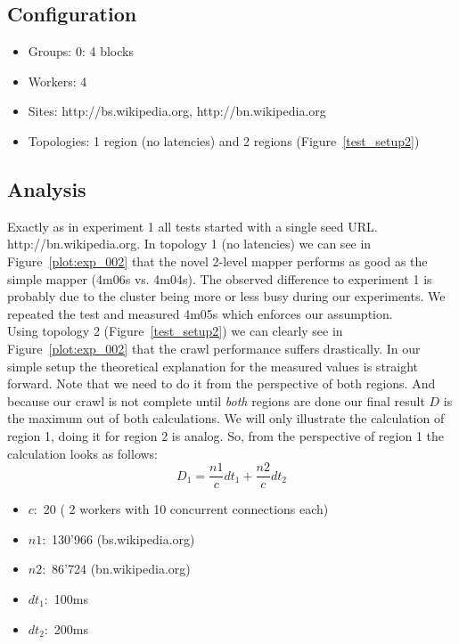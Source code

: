 \subsection{Configuration}
\begin{itemize}
  \item Groups: 0: 4 blocks
  \item Workers: 4
  \item Sites: http://bs.wikipedia.org, http://bn.wikipedia.org
  \item Topologies: 1 region (no latencies) and 2 regions (Figure~\ref{test_setup2})
\end{itemize}

\subsection{Analysis}
Exactly as in experiment 1 all tests started with a single seed URL. http://bn.wikipedia.org. In topology 1 (no latencies) we can see in Figure~\ref{plot:exp_002} that the novel 2-level mapper performs as good as the simple mapper (4m06s vs. 4m04s). The observed difference to experiment 1 is probably due to the cluster being more or less busy during our experiments. We repeated the test and measured 4m05s which enforces our assumption.
\\
Using topology 2 (Figure~\ref{test_setup2}) we can clearly see in Figure~\ref{plot:exp_002} that the crawl performance suffers drastically. In our simple setup the theoretical explanation for the measured values is straight forward. Note that we need to do it from the perspective of both regions. And because our crawl is not complete until \emph{both} regions are done our final result $D$ is the maximum out of both calculations. We will only illustrate the calculation of region 1, doing it for region 2 is analog. So, from the perspective of region 1 the calculation looks as follows:
\newline
\[ D_1 = \frac{n1}{c} dt_1 + \frac{n2}{c} dt_2 \]
\newline
\begin{itemize}
  \item $c:$ 20 ( 2 workers with 10 concurrent connections each)
  \item $n1:$ 130'966 (bs.wikipedia.org)
  \item $n2:$ 86'724 (bn.wikipedia.org)
  \item $dt_1:$ 100ms
  \item $dt_2:$ 200ms
\end{itemize}

